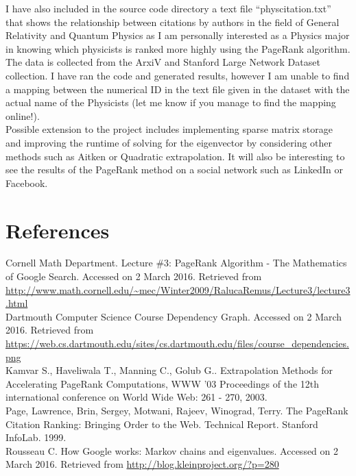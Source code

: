 \documentclass[9.5pt]{extarticle}
\begin{document}
I have also included in the source code directory a text file ``physcitation.txt'' that shows the relationship between citations by authors in the field of General Relativity and Quantum Physics as I am personally interested as a Physics major in knowing which physicists is ranked more highly using the PageRank algorithm. The data is collected from the ArxiV and Stanford Large Network Dataset collection. I have ran the code and generated results, however I am unable to find a mapping between the numerical ID in the text file given in the dataset with the actual name of the Physicists (let me know if you manage to find the mapping online!).\\
 
Possible extension to the project includes implementing sparse matrix storage and improving the runtime of  solving for the eigenvector by considering other methods such as Aitken or Quadratic extrapolation. It will also be interesting to see the results of the PageRank method on a social network such as LinkedIn or Facebook.

\newpage

\section{References}

Cornell Math Department. Lecture \#3: PageRank Algorithm - The Mathematics of Google Search. Accessed on 2 March 2016. Retrieved from \url{http://www.math.cornell.edu/~mec/Winter2009/RalucaRemus/Lecture3/lecture3.html}\\

Dartmouth Computer Science Course Dependency Graph. Accessed on 2 March 2016. Retrieved from \url{https://web.cs.dartmouth.edu/sites/cs.dartmouth.edu/files/course_dependencies.png}\\

Kamvar S., Haveliwala T., Manning C., Golub G.. Extrapolation Methods for Accelerating PageRank
Computations, WWW '03 Proceedings of the 12th international conference on World Wide Web: 261 - 270, 2003.\\

Page, Lawrence, Brin, Sergey, Motwani, Rajeev, Winograd, Terry. The PageRank Citation Ranking: Bringing Order to the Web. Technical Report. Stanford InfoLab. 1999.\\

Rousseau C. How Google works: Markov chains and eigenvalues. Accessed on 2 March 2016. Retrieved from \url{http://blog.kleinproject.org/?p=280}\\
\end{document}
